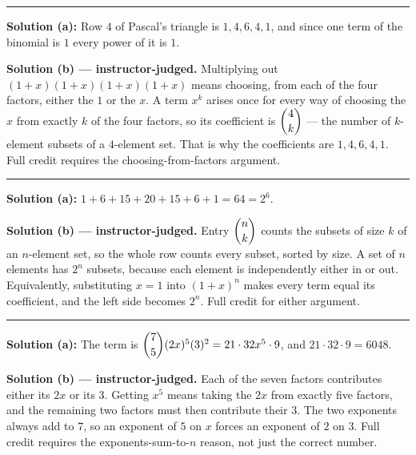 \documentclass[12pt]{article}
\begin{document}
\vspace{0.15cm}\noindent\rule{\linewidth}{0.2pt}\vspace{0.15cm}


\textbf{Solution (a):} \quad Row $4$ of Pascal's triangle is $1, 4, 6, 4, 1$, and since one
term of the binomial is $1$ every power of it is $1$. 

\textbf{Solution (b) --- instructor-judged.} \quad Multiplying out $(1+x)(1+x)(1+x)(1+x)$ means
choosing, from each of the four factors, either the $1$ or the $x$. A term $x^k$ arises once
for every way of choosing the $x$ from exactly $k$ of the four factors, so its coefficient is
$\dbinom{4}{k}$ --- the number of $k$-element subsets of a $4$-element set. That is why the
coefficients are $1, 4, 6, 4, 1$. Full credit requires the choosing-from-factors argument.

\vspace{0.15cm}\noindent\rule{\linewidth}{0.2pt}\vspace{0.15cm}


\textbf{Solution (a):} \quad $1 + 6 + 15 + 20 + 15 + 6 + 1 = 64 = 2^6$. 

\textbf{Solution (b) --- instructor-judged.} \quad Entry $\dbinom{n}{k}$ counts the subsets of
size $k$ of an $n$-element set, so the whole row counts every subset, sorted by size. A set of
$n$ elements has $2^n$ subsets, because each element is independently either in or out.
Equivalently, substituting $x = 1$ into $(1+x)^n$ makes every term equal its coefficient, and
the left side becomes $2^n$. Full credit for either argument.

\vspace{0.15cm}\noindent\rule{\linewidth}{0.2pt}\vspace{0.15cm}


\textbf{Solution (a):} \quad The term is
$\dbinom{7}{5}(2x)^5(3)^2 = 21 \cdot 32x^5 \cdot 9$, and $21 \cdot 32 \cdot 9 = 6048$.

\textbf{Solution (b) --- instructor-judged.} \quad Each of the seven factors contributes either
its $2x$ or its $3$. Getting $x^5$ means taking the $2x$ from exactly five factors, and the
remaining two factors must then contribute their $3$. The two exponents always add to $7$, so
an exponent of $5$ on $x$ forces an exponent of $2$ on $3$. Full credit requires the
exponents-sum-to-$n$ reason, not just the correct number.
\end{document}
